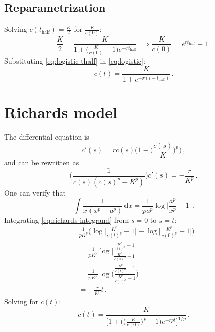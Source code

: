 \documentclass[12pt]{article}
\begin{document}
\subsection{Reparametrization}

Solving $c(t_\text{half}) = \frac{K}{2}$ for $\frac{K}{c(0)}$:
%
\begin{equation}
  \label{eq:logistic-thalf}
  \frac{K}{2} = \frac{K}{1 + \big(\frac{K}{c(0)} - 1\big) e^{-r t_\text{half}}}
  \implies \frac{K}{c(0)} = e^{r t_\text{half}} + 1\,.
\end{equation}
%
Substituting \eqref{eq:logistic-thalf} in \eqref{eq:logistic}:
%
\begin{equation}
  c(t) = \frac{K}{1 + e^{-r (t - t_\text{half})}}\,.
\end{equation}

\section{Richards model}

The differential equation is
%
\begin{equation}
  c'(s) = r c(s) \bigg(1 - \bigg(\frac{c(s)}{K}\bigg)^p\bigg)\,,
\end{equation}
%
and can be rewritten as
%
\begin{equation}
  \label{eq:richards-integrand}
  \bigg(\frac{1}{c(s) (c(s)^p - K^p)}\bigg) c'(s) = -\frac{r}{K^p}\,.
\end{equation}
%
One can verify that
%
\begin{equation}
  \int \frac{1}{x (x^p - a^p)}\,\text{d}x = \frac{1}{p a^p} \log\bigg|\frac{a^p}{x^p} - 1\bigg|\,.
\end{equation}
%
Integrating \eqref{eq:richards-integrand} from $s = 0$ to $s = t$:
%
\begin{equation}
  \begin{aligned}
    &\frac{1}{p K^p} \Bigg(\log\bigg|\frac{K^p}{c(t)^p} - 1\bigg| - \log\bigg|\frac{K^p}{c(0)^p} - 1\bigg|\Bigg) \\
    &= \frac{1}{p K^p} \log\Bigg|\frac{\frac{K^p}{c(t)^p} - 1}{\frac{K^p}{c(0)^p} - 1}\Bigg| \\
    &= \frac{1}{p K^p} \log\Bigg(\frac{\frac{K^p}{c(t)^p} - 1}{\frac{K^p}{c(0)^p} - 1}\Bigg) \\
    &= -\frac{r}{K^p}t\,.
  \end{aligned}
\end{equation}
%
Solving for $c(t)$:
%
\begin{equation}
  \label{eq:richards}
  c(t) = \frac{K}{\big[1 + \big(\big(\frac{K}{c(0)}\big)^p - 1\big) e^{-r p t}\big]^{1/p}}\,.
\end{equation}
\end{document}
